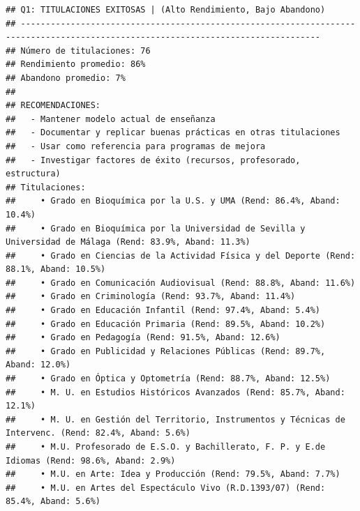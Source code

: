 \documentclass[
]{article}
\newenvironment{Shaded}{\begin{snugshade}}{\end{snugshade}}
\newcommand{\DecValTok}[1]{\textcolor[rgb]{0.00,0.00,0.81}{#1}}
\newcommand{\FunctionTok}[1]{\textcolor[rgb]{0.13,0.29,0.53}{\textbf{#1}}}
\newcommand{\NormalTok}[1]{#1}
\newcommand{\SpecialCharTok}[1]{\textcolor[rgb]{0.81,0.36,0.00}{\textbf{#1}}}
\newcommand{\StringTok}[1]{\textcolor[rgb]{0.31,0.60,0.02}{#1}}
\begin{document}
\begin{Shaded}
\end{Shaded}

\begin{verbatim}
## Q1: TITULACIONES EXITOSAS | (Alto Rendimiento, Bajo Abandono)
## ---------------------------------------------------------------------------------------------------------------------------------- 
## Número de titulaciones: 76 
## Rendimiento promedio: 86% 
## Abandono promedio: 7% 
## 
## RECOMENDACIONES:
##   - Mantener modelo actual de enseñanza
##   - Documentar y replicar buenas prácticas en otras titulaciones
##   - Usar como referencia para programas de mejora
##   - Investigar factores de éxito (recursos, profesorado, estructura)
## Titulaciones:
##     • Grado en Bioquímica por la U.S. y UMA (Rend: 86.4%, Aband: 10.4%)
##     • Grado en Bioquímica por la Universidad de Sevilla y Universidad de Málaga (Rend: 83.9%, Aband: 11.3%)
##     • Grado en Ciencias de la Actividad Física y del Deporte (Rend: 88.1%, Aband: 10.5%)
##     • Grado en Comunicación Audiovisual (Rend: 88.8%, Aband: 11.6%)
##     • Grado en Criminología (Rend: 93.7%, Aband: 11.4%)
##     • Grado en Educación Infantil (Rend: 97.4%, Aband: 5.4%)
##     • Grado en Educación Primaria (Rend: 89.5%, Aband: 10.2%)
##     • Grado en Pedagogía (Rend: 91.5%, Aband: 12.6%)
##     • Grado en Publicidad y Relaciones Públicas (Rend: 89.7%, Aband: 12.0%)
##     • Grado en Óptica y Optometría (Rend: 88.7%, Aband: 12.5%)
##     • M. U. en Estudios Históricos Avanzados (Rend: 85.7%, Aband: 12.1%)
##     • M. U. en Gestión del Territorio, Instrumentos y Técnicas de Intervenc. (Rend: 82.4%, Aband: 5.6%)
##     • M.U. Profesorado de E.S.O. y Bachillerato, F. P. y E.de Idiomas (Rend: 98.6%, Aband: 2.9%)
##     • M.U. en Arte: Idea y Producción (Rend: 79.5%, Aband: 7.7%)
##     • M.U. en Artes del Espectáculo Vivo (R.D.1393/07) (Rend: 85.4%, Aband: 5.6%)

\end{verbatim}
\end{document}
